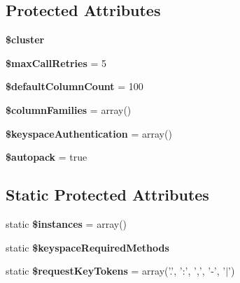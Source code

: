 \subsection*{Protected Attributes}
\begin{DoxyCompactItemize}
\item 
\hypertarget{classCassandra_a06be00e38d48ede339c5c46b37967a60}{
{\bfseries \$cluster}}
\label{classCassandra_a06be00e38d48ede339c5c46b37967a60}

\item 
\hypertarget{classCassandra_a717596cba1c3cef69e259c852196ec82}{
{\bfseries \$maxCallRetries} = 5}
\label{classCassandra_a717596cba1c3cef69e259c852196ec82}

\item 
\hypertarget{classCassandra_a1a993bec38a0a1802388011500b21157}{
{\bfseries \$defaultColumnCount} = 100}
\label{classCassandra_a1a993bec38a0a1802388011500b21157}

\item 
\hypertarget{classCassandra_a54b0de1fe5ee18a9362a26ea78b1abc3}{
{\bfseries \$columnFamilies} = array()}
\label{classCassandra_a54b0de1fe5ee18a9362a26ea78b1abc3}

\item 
\hypertarget{classCassandra_a3aa3bbd7c414054287c8c1898a927b1d}{
{\bfseries \$keyspaceAuthentication} = array()}
\label{classCassandra_a3aa3bbd7c414054287c8c1898a927b1d}

\item 
\hypertarget{classCassandra_a1e4f7ff20a81e62a72ededbaef50fbac}{
{\bfseries \$autopack} = true}
\label{classCassandra_a1e4f7ff20a81e62a72ededbaef50fbac}

\end{DoxyCompactItemize}
\subsection*{Static Protected Attributes}
\begin{DoxyCompactItemize}
\item 
\hypertarget{classCassandra_a96554e1c0455dd8e952630cf4f222b66}{
static {\bfseries \$instances} = array()}
\label{classCassandra_a96554e1c0455dd8e952630cf4f222b66}

\item 
\hypertarget{classCassandra_a50fd67e22e2cc47e36171ae23b7139cd}{
static {\bfseries \$keyspaceRequiredMethods}}
\label{classCassandra_a50fd67e22e2cc47e36171ae23b7139cd}

\item 
\hypertarget{classCassandra_a2a7936715f303ae92e9d6923e456d371}{
static {\bfseries \$requestKeyTokens} = array('.', ':', ',', '-\/', '$|$')}
\label{classCassandra_a2a7936715f303ae92e9d6923e456d371}

\end{DoxyCompactItemize}
